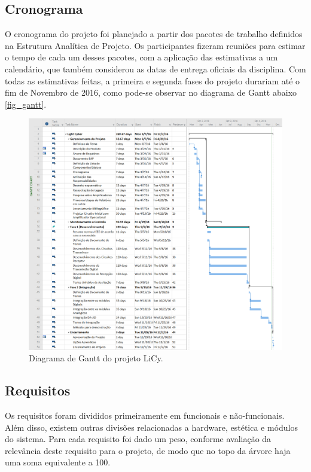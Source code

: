 	\subsection{Cronograma}\label{subsec-cronograma}

	O cronograma do projeto foi planejado a partir dos pacotes de trabalho definidos na Estrutura Analítica de Projeto. Os participantes fizeram reuniões para estimar o tempo de cada um desses pacotes, com a aplicação das estimativas a um calendário, que também considerou as datas de entrega oficiais da disciplina. Com todas as estimativas feitas, a primeira e segunda fases do projeto durariam até o fim de Novembro de 2016, como pode-se observar no diagrama de Gantt abaixo \autoref{fig_gantt}.

	\begin{figure}[h!]
		\caption{\label{fig_gantt}Diagrama de Gantt do projeto LiCy.}
		\centering
		\includegraphics[width=1.0\textwidth]{gantt.png}
	\end{figure}

	\subsection{Requisitos}\label{subsec-requisitos}

	Os requisitos foram divididos primeiramente em funcionais e não-funcionais. Além disso, existem outras divisões relacionadas a hardware, estética e módulos do sistema. Para cada requisito foi dado um peso, conforme avaliação da relevância deste requisito para o projeto, de modo que no topo da árvore haja uma soma equivalente a 100.

